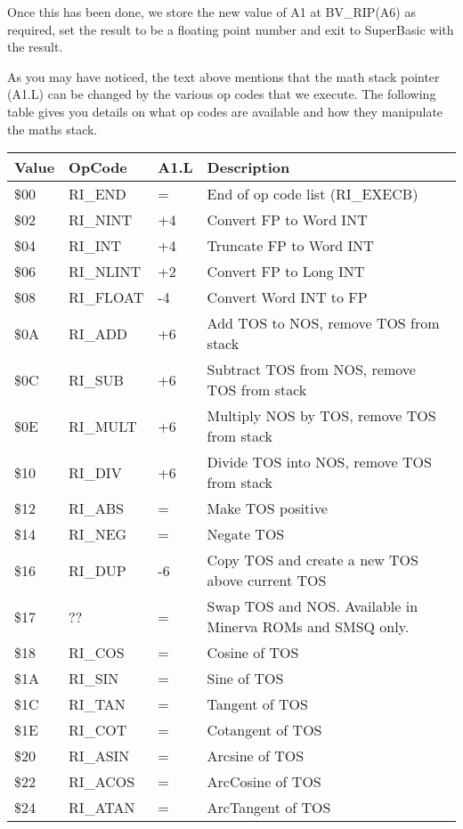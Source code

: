 Once this has been done, we store the new value of A1 at BV\_RIP(A6)
    as required, set the result to be a floating point number and exit to
    SuperBasic with the result.

As you may have noticed, the text above mentions that the math stack
    pointer (A1.L) can be changed by the various op codes that we execute. The
    following table gives you details on what op codes are available and how
    they manipulate the maths stack.

\begin{table}[htbp]
\centering
\begin{tabular}{l l l l}
\toprule
\textbf{Value} & \textbf{OpCode} & \textbf{A1.L} & \textbf{Description} \\
\midrule
%
\$00 & RI\_END   &  = & End of op code list (RI\_EXECB) \\
\$02 & RI\_NINT  & +4 & Convert FP to Word INT \\
\$04 & RI\_INT   & +4 & Truncate FP to Word INT \\
\$06 & RI\_NLINT & +2 & Convert FP to Long INT \\
\$08 & RI\_FLOAT & -4 & Convert Word INT to FP \\
\$0A & RI\_ADD   & +6 & Add TOS to NOS, remove TOS from stack \\
\$0C & RI\_SUB   & +6 & Subtract TOS from NOS, remove TOS from stack \\
\$0E & RI\_MULT  & +6 & Multiply NOS by TOS, remove TOS from stack \\
\$10 & RI\_DIV   & +6 & Divide TOS into NOS, remove TOS from stack \\
\$12 & RI\_ABS   &  = & Make TOS positive \\
\$14 & RI\_NEG   &  = & Negate TOS \\
\$16 & RI\_DUP   & -6 & Copy TOS and create a new TOS above current TOS \\
\$17 & ??       &  = & Swap TOS and NOS. Available in Minerva ROMs and SMSQ only. \\
\$18 & RI\_COS   &  = & Cosine of TOS \\
\$1A & RI\_SIN   &  = & Sine of TOS \\
\$1C & RI\_TAN   &  = & Tangent of TOS \\
\$1E & RI\_COT   &  = & Cotangent of TOS \\
\$20 & RI\_ASIN  &  = & Arcsine of TOS \\
\$22 & RI\_ACOS  &  = & ArcCosine of TOS \\
\$24 & RI\_ATAN  &  = & ArcTangent of TOS \\

\end{tabular}
\end{table}
